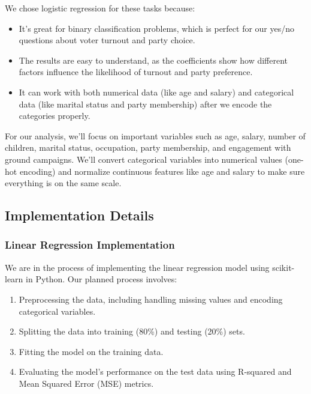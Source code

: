 \documentclass[conference]{IEEEtran}
\begin{document}
We chose logistic regression for these tasks because:
\begin{itemize}
    \item It’s great for binary classification problems, which is perfect for our yes/no questions about voter turnout and party choice.
    \item The results are easy to understand, as the coefficients show how different factors influence the likelihood of turnout and party preference.
    \item It can work with both numerical data (like age and salary) and categorical data (like marital status and party membership) after we encode the categories properly.
\end{itemize}

For our analysis, we'll focus on important variables such as age, salary, number of children, marital status, occupation, party membership, and engagement with ground campaigns. We'll convert categorical variables into numerical values (one-hot encoding) and normalize continuous features like age and salary to make sure everything is on the same scale.




\subsection{Implementation Details}
\subsubsection{Linear Regression Implementation}
We are in the process of implementing the linear regression model using scikit-learn in Python. Our planned process involves:

\begin{enumerate}
    \item Preprocessing the data, including handling missing values and encoding categorical variables.
    \item Splitting the data into training (80\%) and testing (20\%) sets.
    \item Fitting the model on the training data.
    \item Evaluating the model's performance on the test data using R-squared and Mean Squared Error (MSE) metrics.
\end{enumerate}
\end{document}
